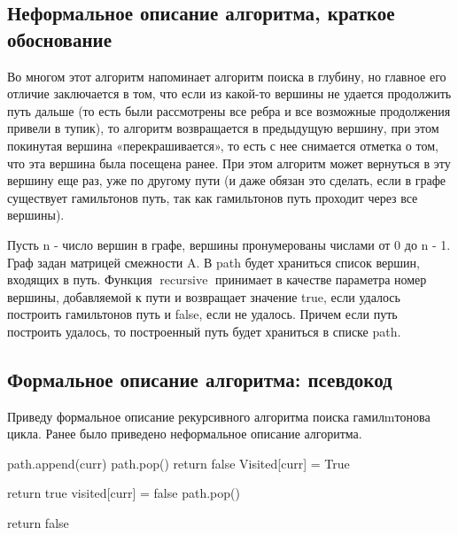 \subsection{Неформальное описание алгоритма, краткое обоснование}

Во многом этот алгоритм напоминает алгоритм поиска в глубину, но главное его отличие заключается в том, что если из какой-то вершины не удается продолжить путь дальше (то есть были рассмотрены все ребра и все возможные продолжения привели в тупик), то алгоритм возвращается в предыдущую вершину, при этом покинутая вершина «перекрашивается», то есть с нее снимается отметка о том, что эта вершина была посещена ранее.
При этом алгоритм может вернуться в эту вершину еще раз, уже по другому пути (и даже обязан это сделать, если в графе существует гамильтонов путь, так как гамильтонов путь проходит через все вершины).

Пусть n - число вершин в графе, вершины пронумерованы числами от 0 до n - 1.
Граф задан матрицей смежности A.
В path будет храниться список вершин, входящих в путь.
Функция $\operatorname{recursive}$ принимает в качестве параметра номер вершины, добавляемой к пути и возвращает значение true, если удалось построить гамильтонов путь и false, если не удалось.
Причем если путь построить удалось, то построенный путь будет храниться в списке path.

\subsection{Формальное описание алгоритма: псевдокод}
Приведу формальное описание рекурсивного алгоритма поиска гамилmтонова цикла.
Ранее было приведено неформальное описание алгоритма.

\begin{algorithmic}[1]
    \State path.append(curr)
        \Else
            \State path.pop()
            \State return false
        \EndIf
    \EndIf
    \State Visited[curr] = True

                \State return true
            \EndIf
        \EndIf
    \EndFor
    \State visited[curr] = false
    \State path.pop()

    \State return false
\EndProcedure
\end{algorithmic}


